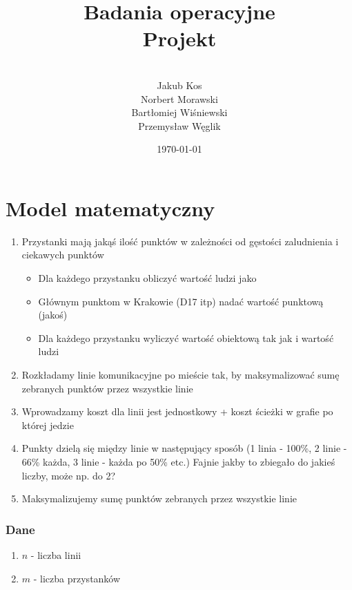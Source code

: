 \documentclass[12pt,a4paper,openright]{mwrep}
\begin{document}
\title{
Badania operacyjne\\
Projekt\\
}

\author{\\Jakub Kos\\Norbert Morawski
\\Bartłomiej Wiśniewski\\Przemysław Węglik}

\date{\today}

\maketitle

\chapter{Model matematyczny}

\begin{enumerate}
	\item Przystanki mają jakąś ilość punktów w zależności od gęstości zaludnienia i ciekawych punktów
	\begin{itemize}
		\item Dla każdego przystanku obliczyć wartość ludzi jako %
		\item Głównym punktom w Krakowie (D17 itp) nadać wartość punktową (jakoś)
		\item Dla każdego przystanku wyliczyć wartość obiektową tak jak i wartość ludzi
	\end{itemize}
	\item Rozkładamy linie komunikacyjne po mieście tak, by maksymalizować sumę zebranych punktów przez wszystkie linie
	\item Wprowadzamy koszt dla linii jest jednostkowy + koszt ścieżki w grafie po której jedzie
	\item Punkty dzielą się między linie w następujący sposób (1 linia - 100\%, 2 linie - 66\% każda, 3 linie - każda po 50\% etc.) Fajnie jakby to zbiegało do jakieś liczby, może np. do 2?
	\item Maksymalizujemy sumę punktów zebranych przez wszystkie linie
\end{enumerate}

\subsection{Dane}
	\begin{enumerate}
		\item $n$ - liczba linii
		\item $m$ - liczba przystanków
	\end{enumerate}
\end{document}
